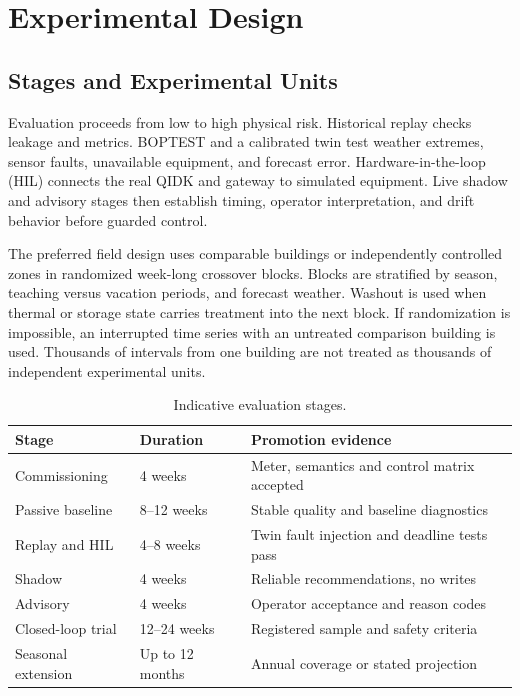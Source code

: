 \section{Experimental Design}

\subsection{Stages and Experimental Units}

Evaluation proceeds from low to high physical risk. Historical replay checks leakage and metrics. BOPTEST and a calibrated twin test weather extremes, sensor faults, unavailable equipment, and forecast error. Hardware-in-the-loop (HIL) connects the real QIDK and gateway to simulated equipment. Live shadow and advisory stages then establish timing, operator interpretation, and drift behavior before guarded control.

The preferred field design uses comparable buildings or independently controlled zones in randomized week-long crossover blocks. Blocks are stratified by season, teaching versus vacation periods, and forecast weather. Washout is used when thermal or storage state carries treatment into the next block. If randomization is impossible, an interrupted time series with an untreated comparison building is used. Thousands of intervals from one building are not treated as thousands of independent experimental units.

\begin{table}[t]
	\centering
	\caption{Indicative evaluation stages.}
	\label{tab:stages}
	\begin{tabularx}{\columnwidth}{p{}p{}X}
		\toprule
		Stage              & Duration        & Promotion evidence                           \\
		\midrule
		Commissioning      & 4 weeks         & Meter, semantics and control matrix accepted \\
		Passive baseline   & 8--12 weeks     & Stable quality and baseline diagnostics      \\
		Replay and HIL     & 4--8 weeks      & Twin fault injection and deadline tests pass \\
		Shadow             & 4 weeks         & Reliable recommendations, no writes          \\
		Advisory           & 4 weeks         & Operator acceptance and reason codes         \\
		Closed-loop trial  & 12--24 weeks    & Registered sample and safety criteria        \\
		Seasonal extension & Up to 12 months & Annual coverage or stated projection         \\
		\bottomrule
	\end{tabularx}
\end{table}

